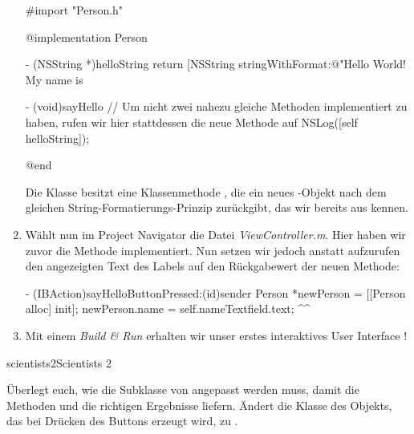 \documentclass[parskip=half, final]{scrreprt}
\begin{document}
\begin{lecture}
\begin{enumerate}
\begin{objclst}
#import "Person.h"

@implementation Person

- (NSString *)helloString {
    return [NSString stringWithFormat:@"Hello World! My name is %
}

- (void)sayHello {
    // Um nicht zwei nahezu gleiche Methoden implementiert zu haben, rufen wir hier stattdessen die neue Methode auf
    NSLog([self helloString]);
}

@end
\end{objclst}

Die Klasse  besitzt eine Klassenmethode , die ein neues -Objekt nach dem gleichen String-Formatierungs-Prinzip zurückgibt, das wir bereits aus  kennen.

\item Wählt nun im Project Navigator die Datei \emph{ViewController.m}. Hier haben wir zuvor die Methode  implementiert. Nun setzen wir jedoch anstatt  aufzurufen den angezeigten Text des Labels auf den Rückgabewert der neuen  Methode:

\begin{objclst}
- (IBAction)sayHelloButtonPressed:(id)sender {
    Person *newPerson = [[Person alloc] init];
    newPerson.name = self.nameTextfield.text;
    ^^
}
\end{objclst}

\item Mit einem \emph{Build \& Run} erhalten wir unser erstes interaktives User Interface !


\end{enumerate}

\begin{exc}

\begin{excitem}{scientists2}{Scientists 2}

Überlegt euch, wie die Subklasse  von  angepasst werden muss, damit die Methoden  und  die richtigen Ergebnisse liefern. Ändert die Klasse des Objekts, das bei Drücken des Buttons erzeugt wird, zu .


\end{excitem}
\end{exc}
\end{lecture}
\end{document}

